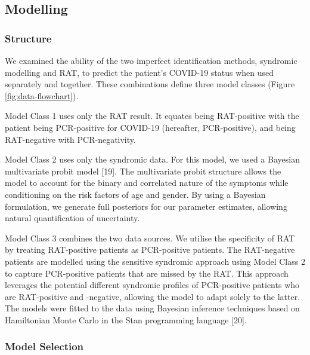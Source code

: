 \documentclass[]{elsarticle} %
\begin{document}
\hypertarget{modelling}{%
\subsection{Modelling}\label{modelling}}

\hypertarget{structure}{%
\subsubsection{Structure}\label{structure}}

We examined the ability of the two imperfect identification methods, syndromic modelling and RAT, to predict the patient's COVID-19 status when used separately and together.
These combinations define three model classes (Figure \ref{fig:data-flowchart}).

Model Class 1 uses only the RAT result.
It equates being RAT-positive with the patient being PCR-positive for COVID-19 (hereafter, PCR-positive), and being RAT-negative with PCR-negativity.

Model Class 2 uses only the syndromic data.
For this model, we used a Bayesian multivariate probit model {[}19{]}.
The multivariate probit structure allows the model to account for the binary and correlated nature of the symptoms while conditioning on the risk factors of age and gender.
By using a Bayesian formulation, we generate full posteriors for our parameter estimates, allowing natural quantification of uncertainty.

Model Class 3 combines the two data sources.
We utilise the specificity of RAT by treating RAT-positive patients as PCR-positive patients.
The RAT-negative patients are modelled using the sensitive syndromic approach using Model Class 2 to capture PCR-positive patients that are missed by the RAT.
This approach leverages the potential different syndromic profiles of PCR-positive patients who are RAT-positive and -negative, allowing the model to adapt solely to the latter.
The models were fitted to the data using Bayesian inference techniques based on Hamiltonian Monte Carlo in the Stan programming language {[}20{]}.

\hypertarget{model-selection}{%
\subsubsection{Model Selection}\label{model-selection}}
\end{document}
